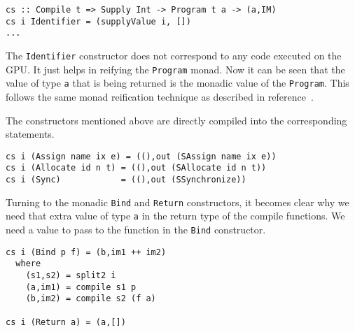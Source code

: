 \begin{small}
\begin{verbatim} 
cs :: Compile t => Supply Int -> Program t a -> (a,IM) 
cs i Identifier = (supplyValue i, [])
... 
\end{verbatim}
\end{small}

The {\tt Identifier} constructor does not correspond to any code executed on the GPU. 
It just helps in reifying the {\tt Program} monad. Now it can 
be seen that the value of type {\tt a} that is being returned is the monadic value of 
the {\tt Program}. This follows the same monad reification technique as described 
in reference~.  


The constructors mentioned above are directly compiled into the corresponding 
statements. 

\begin{small}
\begin{verbatim} 
cs i (Assign name ix e) = ((),out (SAssign name ix e))
cs i (Allocate id n t) = ((),out (SAllocate id n t))
cs i (Sync)            = ((),out (SSynchronize))
\end{verbatim}
\end{small}

Turning to the monadic {\tt Bind} and {\tt Return} constructors, 
it becomes clear why we need that extra value of type {\tt a} in the return 
type of the compile functions.
We need a value to pass to the function in 
the {\tt Bind} constructor. 

\begin{small}
\begin{verbatim} 
cs i (Bind p f) = (b,im1 ++ im2) 
  where
    (s1,s2) = split2 i
    (a,im1) = compile s1 p
    (b,im2) = compile s2 (f a)

cs i (Return a) = (a,[])
\end{verbatim}
\end{small}




